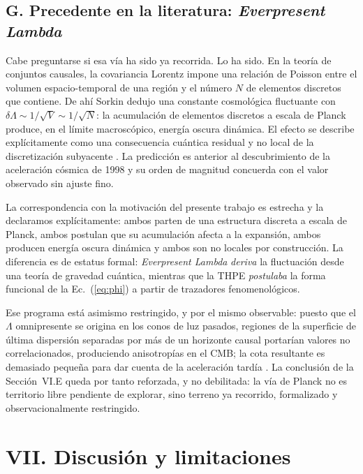 \documentclass[aps,prd,twocolumn,superscriptaddress,nofootinbib,floatfix]{revtex4-2}
\begin{document}
\subsection*{G. Precedente en la literatura: \emph{Everpresent Lambda}}

Cabe preguntarse si esa v\'ia ha sido ya recorrida. Lo ha sido. En la
teor\'ia de conjuntos causales, la covariancia Lorentz impone una
relaci\'on de Poisson entre el volumen espacio-temporal de una regi\'on
y el n\'umero $N$ de elementos discretos que contiene. De ah\'i Sorkin
\cite{Sorkin1991,Sorkin2000} dedujo una constante cosmol\'ogica
fluctuante con $\delta\Lambda\sim1/\sqrt{V}\sim1/\sqrt{N}$: la
acumulaci\'on de elementos discretos a escala de Planck produce, en el
l\'imite macrosc\'opico, energ\'ia oscura din\'amica. El efecto se
describe expl\'icitamente como una consecuencia cu\'antica residual y no
local de la discretizaci\'on subyacente \cite{Ahmed2004,Ahmed2013}. La
predicci\'on es anterior al descubrimiento de la aceleraci\'on
c\'osmica de 1998 y su orden de magnitud concuerda con el valor
observado sin ajuste fino.

La correspondencia con la motivaci\'on del presente trabajo es estrecha
y la declaramos expl\'icitamente: ambos parten de una estructura
discreta a escala de Planck, ambos postulan que su acumulaci\'on afecta
a la expansi\'on, ambos producen energ\'ia oscura din\'amica y ambos son
no locales por construcci\'on. La diferencia es de estatus formal:
\emph{Everpresent Lambda} \emph{deriva} la fluctuaci\'on desde una
teor\'ia de gravedad cu\'antica, mientras que la THPE \emph{postulaba}
la forma funcional de la Ec.~(\ref{eq:phi}) a partir de trazadores
fenomenol\'ogicos.

Ese programa est\'a asimismo restringido, y por el mismo observable:
puesto que el $\Lambda$ omnipresente se origina en los conos de luz
pasados, regiones de la superficie de \'ultima dispersi\'on separadas
por m\'as de un horizonte causal portar\'ian valores no correlacionados,
produciendo anisotrop\'ias en el CMB; la cota resultante es demasiado
peque\~na para dar cuenta de la aceleraci\'on tard\'ia
\cite{Barrow2007}. La conclusi\'on de la Secci\'on~VI.E queda por tanto
reforzada, y no debilitada: la v\'ia de Planck no es territorio libre
pendiente de explorar, sino terreno ya recorrido, formalizado y
observacionalmente restringido.

\section*{VII. Discusi\'on y limitaciones}
\end{document}
